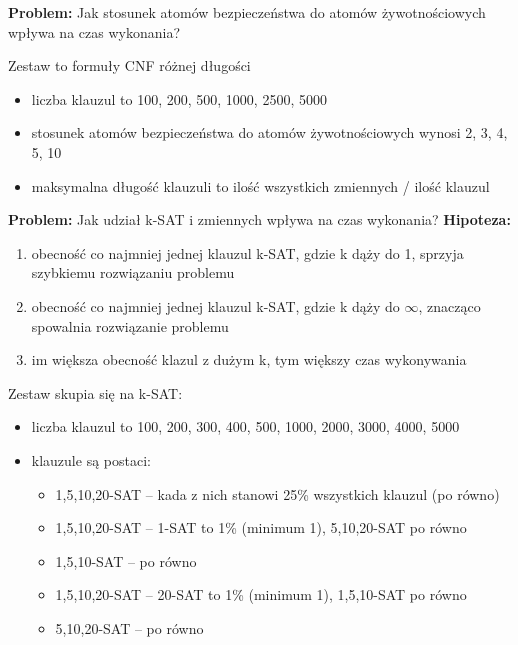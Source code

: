 \documentclass[a4paper,12pt]{article}
\begin{document}
\noindent
\textbf{Problem:} Jak stosunek atomów bezpieczeństwa do atomów żywotnościowych wpływa na czas wykonania?

Zestaw to formuły CNF różnej długości
\begin{itemize}
  \item liczba klauzul to 100, 200, 500, 1000, 2500, 5000
  \item stosunek atomów bezpieczeństwa do atomów żywotnościowych wynosi 2, 3, 4, 5, 10
  \item maksymalna długość klauzuli to ilość wszystkich zmiennych / ilość klauzul
\end{itemize}

\noindent
\textbf{Problem:} Jak udział k-SAT i zmiennych wpływa na czas wykonania?
\newline
\textbf{Hipoteza:}
\begin{enumerate}
  \item obecność co najmniej jednej klauzul k-SAT, gdzie k dąży do 1, sprzyja szybkiemu rozwiązaniu problemu
  \item obecność co najmniej jednej klauzul k-SAT, gdzie k dąży do $\infty$, znacząco spowalnia rozwiązanie problemu
  \item im większa obecność klazul z dużym k, tym większy czas wykonywania
\end{enumerate}

Zestaw skupia się na k-SAT:
\begin{itemize}
  \item liczba klauzul to 100, 200, 300, 400, 500, 1000, 2000, 3000, 4000, 5000
  \item klauzule są postaci:
    \begin{itemize}
      \item 1,5,10,20-SAT -- kada z nich stanowi 25\% wszystkich klauzul (po równo)
      \item 1,5,10,20-SAT -- 1-SAT to 1\% (minimum 1), 5,10,20-SAT po równo
      \item 1,5,10-SAT -- po równo
      \item 1,5,10,20-SAT -- 20-SAT to 1\% (minimum 1), 1,5,10-SAT po równo
      \item 5,10,20-SAT -- po równo
    \end{itemize}
\end{itemize}

\end{document}
